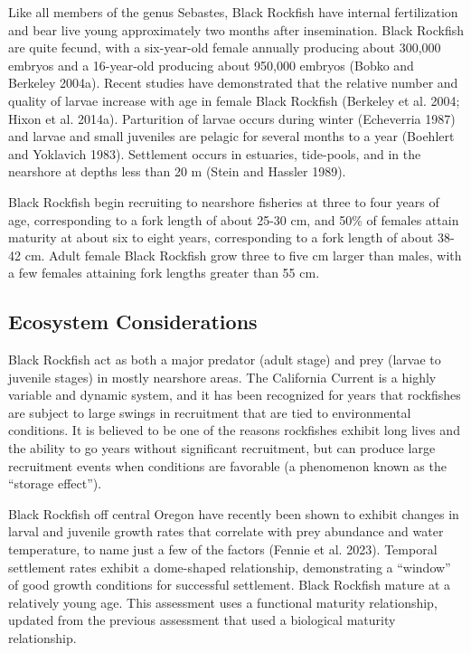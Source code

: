 \documentclass[11pt,
  letterpaper,
]{article}
\begin{document}
Like all members of the genus Sebastes, Black Rockfish have internal fertilization and bear live young approximately two months after insemination. Black Rockfish are quite fecund, with a six-year-old female annually producing about 300,000 embryos and a 16-year-old producing about 950,000 embryos (Bobko and Berkeley 2004a). Recent studies have demonstrated that the relative number and quality of larvae increase with age in female Black Rockfish (Berkeley et al. 2004; Hixon et al. 2014a). Parturition of larvae occurs during winter (Echeverria 1987) and larvae and small juveniles are pelagic for several months to a year (Boehlert and Yoklavich 1983). Settlement occurs in estuaries, tide-pools, and in the nearshore at depths less than 20 m (Stein and Hassler 1989).

Black Rockfish begin recruiting to nearshore fisheries at three to four years of age, corresponding to a fork length of about 25-30 cm, and 50\% of females attain maturity at about six to eight years, corresponding to a fork length of about 38-42 cm. Adult female Black Rockfish grow three to five cm larger than males, with a few females attaining fork lengths greater than 55 cm.

\hypertarget{ecosystem-considerations-1}{%
\subsection{Ecosystem Considerations}\label{ecosystem-considerations-1}}

Black Rockfish act as both a major predator (adult stage) and prey (larvae to juvenile stages) in mostly nearshore areas. The California Current is a highly variable and dynamic system, and it has been recognized for years that rockfishes are subject to large swings in recruitment that are tied to environmental conditions. It is believed to be one of the reasons rockfishes exhibit long lives and the ability to go years without significant recruitment, but can produce large recruitment events when conditions are favorable (a phenomenon known as the ``storage effect'').

Black Rockfish off central Oregon have recently been shown to exhibit changes in larval and juvenile growth rates that correlate with prey abundance and water temperature, to name just a few of the factors (Fennie et al. 2023). Temporal settlement rates exhibit a dome-shaped relationship, demonstrating a ``window'' of good growth conditions for successful settlement. Black Rockfish mature at a relatively young age. This assessment uses a functional maturity relationship, updated from the previous assessment that used a biological maturity relationship.
\end{document}
